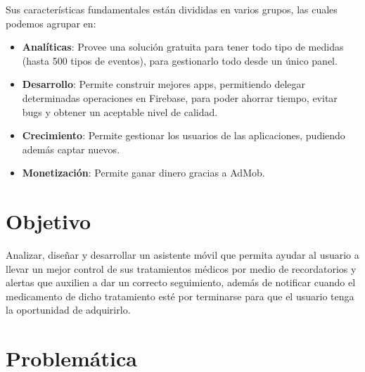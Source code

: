 Sus características fundamentales están divididas en varios grupos, las cuales podemos agrupar en\cite{Referencia20}:
\begin{itemize}
	\item \textbf{Analíticas}: Provee una solución gratuita para tener todo tipo de medidas (hasta 500 tipos de eventos), para gestionarlo todo desde un único panel.
	
	\item \textbf{Desarrollo}: Permite construir mejores apps, permitiendo delegar determinadas operaciones en Firebase, para poder ahorrar tiempo, evitar bugs y obtener un aceptable nivel de calidad.
	
	\item \textbf{Crecimiento}: Permite gestionar los usuarios de las aplicaciones, pudiendo además captar nuevos.
	
	\item \textbf{Monetización}: Permite ganar dinero gracias a AdMob.
	
\end{itemize}


%
%
%

\section{Objetivo}
Analizar, diseñar y desarrollar un asistente móvil que permita ayudar al usuario a llevar un mejor control de sus tratamientos médicos por medio de recordatorios y alertas que auxilien a dar un correcto seguimiento, además de notificar cuando el medicamento de dicho tratamiento esté por terminarse para que el usuario tenga la oportunidad de adquirirlo.

\section{Problemática}

